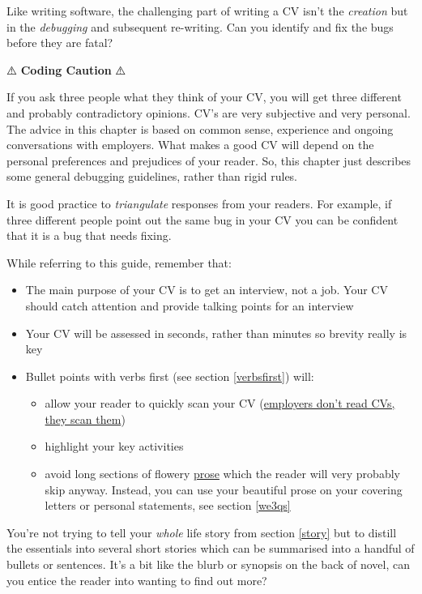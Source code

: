 \documentclass[
]{book}
\providecommand{\tightlist}{%
  \setlength{\itemsep}{0pt}\setlength{\parskip}{0pt}}
\begin{document}
Like writing software, the challenging part of writing a CV isn't the \emph{creation} but in the \emph{debugging} and subsequent re-writing. Can you identify and fix the bugs before they are fatal?

⚠️ \textbf{Coding Caution} ⚠️

If you ask three people what they think of your CV, you will get three different and probably contradictory opinions. CV's are very subjective and very personal. The advice in this chapter is based on common sense, experience and ongoing conversations with employers. What makes a good CV will depend on the personal preferences and prejudices of your reader. So, this chapter just describes some general debugging guidelines, rather than rigid rules.

It is good practice to \emph{triangulate} responses from your readers. For example, if three different people point out the same bug in your CV you can be confident that it is a bug that needs fixing.

While referring to this guide, remember that:

\begin{itemize}
\tightlist
\item
  The main purpose of your CV is to get an interview, not a job. Your CV should catch attention and provide talking points for an interview
\item
  Your CV will be assessed in seconds, rather than minutes so brevity really is key
\item
  Bullet points with verbs first (see section \ref{verbsfirst}) will:

  \begin{itemize}
  \tightlist
  \item
    allow your reader to quickly scan your CV (\href{https://readabilityguidelines.co.uk/content-design/how-people-read/}{employers don't read CVs, they scan them}) \citep{scanning}
  \item
    highlight your key activities
  \item
    avoid long sections of flowery \href{https://en.wikipedia.org/wiki/Prose}{prose} which the reader will very probably skip anyway. Instead, you can use your beautiful prose on your covering letters or personal statements, see section \ref{we3qs}
  \end{itemize}
\end{itemize}

You're not trying to tell your \emph{whole} life story from section \ref{story} but to distill the essentials into several short stories which can be summarised into a handful of bullets or sentences. It's a bit like the blurb or synopsis on the back of novel, can you entice the reader into wanting to find out more?
\end{document}
